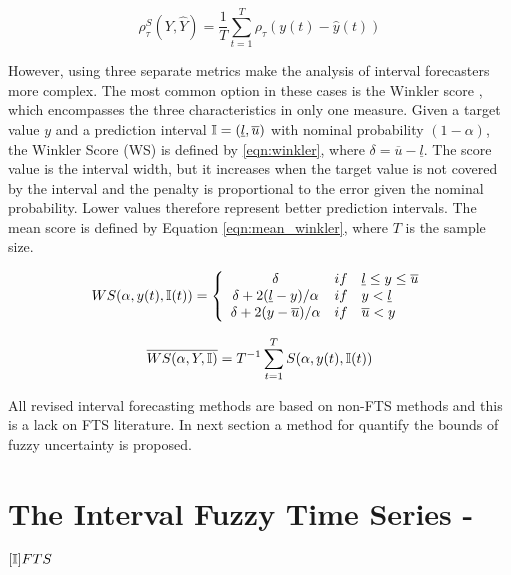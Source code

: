 \begin{equation}
\rho_\tau^S(Y,\hat{Y}) = \frac{1}{T}\sum_{t=1}^T \rho_\tau(y(t) - \hat{y}(t))
\label{eqn:pinball_score}
\end{equation}

However, using three separate metrics make the analysis of interval forecasters more complex. The most common option in these cases is the Winkler score \cite{winklerscore}, which encompasses the three characteristics in only one measure. Given a target value $y$ and a prediction interval $\mathbb{I} = (\underline{l},\overline{u})$ with nominal probability $(1 - \alpha)$, the Winkler Score (WS) is defined by  \eqref{eqn:winkler}, where $\delta = \overline{u} - \underline{l}$. The score value is the interval width, but it increases when the target value is not covered by the interval and the penalty is proportional to the error given the nominal probability. Lower values therefore represent better prediction intervals. The mean score is defined by Equation \eqref{eqn:mean_winkler}, where $T$ is the sample size.

\begin{equation}
WS(\alpha, y(t), \mathbb{I}(t)) = \left\{ \begin{array}{ccl}
\delta & if & \underline{l} \leq y \leq \overline{u} \\
\delta + 2(\underline{l} - y)/\alpha & if & y < \underline{l}  \\
\delta + 2(y - \overline{u})/\alpha & if & \overline{u} < y   
\end{array} \right.
\label{eqn:winkler}
\end{equation}

\begin{equation}
\overline{WS(\alpha, Y, \mathbb{I})} = T^{-1} \sum_{t=1}^T S(\alpha, y(t),\mathbb{I}(t))
\label{eqn:mean_winkler}
\end{equation}

All revised interval forecasting methods are based on non-FTS methods and this is a lack on FTS literature. In next section a method for quantify the bounds of fuzzy uncertainty is proposed.


%
\section{The Interval Fuzzy Time Series  - $[\mathbb{I}]FTS$}
\label{sec:ifts}

